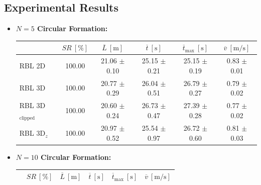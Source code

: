     \subsection{Experimental Results}
        \begin{itemize}
            \item \textbf{$N = 5$ Circular Formation:}
                \begin{table}[H]
                    \centering
                    \renewcommand{\arraystretch}{1.2}
                    \begin{tabular}{|l|c|c|c|c|c|}
                    \hline
                                                & \( SR \ [\%] \) & \( \overline{L} \ [\mathrm{m}] \) & \( \overline{t} \ [\mathrm{s}] \) & \( \overline{t}_{\text{max}} \ [\mathrm{s}] \) & \( \overline{v} \ [\mathrm{m/s}] \)     \\ \hline
                    RBL \ac{2D}                      & 100.00          & 21.06 $\pm$ 0.10                  & 25.15 $\pm$ 0.21                  & 25.15 $\pm$ 0.19                               & 0.83 $\pm$ 0.01                         \\ \hline
                    RBL \ac{3D}                      & 100.00          & 20.77 $\pm$ 0.29                  & 26.04 $\pm$ 0.51                  & 26.79 $\pm$ 0.27                               & 0.79 $\pm$ 0.02                         \\ \hline
                    RBL \ac{3D}\(_{\text{clipped}}\) & 100.00          & 20.60 $\pm$ 0.24                  & 26.73 $\pm$ 0.47                  & 27.39 $\pm$ 0.28                               & 0.77 $\pm$ 0.02                         \\ \hline
                    RBL \ac{3D}\(_z\)                & 100.00          & 20.97 $\pm$ 0.52                  & 25.54 $\pm$ 0.97                  & 26.72 $\pm$ 0.60                               & 0.81 $\pm$ 0.03                         \\ \hline
                    \end{tabular}
                \end{table}
            \item \textbf{$N = 10$ Circular Formation:}
                \begin{table}[H]
                    \centering
                    \renewcommand{\arraystretch}{1.2}
                    \begin{tabular}{|l|c|c|c|c|c|}
                    \hline
                                                & \( SR \ [\%] \) & \( \overline{L} \ [\mathrm{m}] \) & \( \overline{t} \ [\mathrm{s}] \) & \( \overline{t}_{\text{max}} \ [\mathrm{s}] \) & \( \overline{v} \ [\mathrm{m/s}] \)     \\ \hline

\end{tabular}
\end{table}
\end{itemize}
